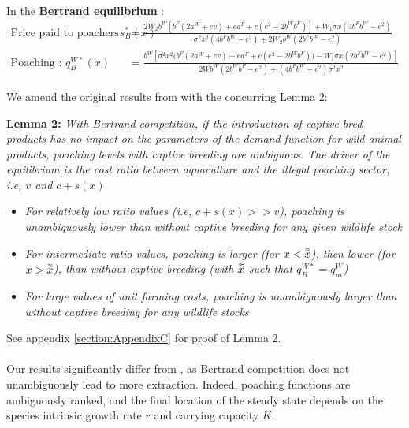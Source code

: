 In the \textbf{Bertrand equilibrium }:
\begin{align}
    \text{Price paid to poachers  }
 s_B^*(x) &=\frac{2 W_2 b^W[b^F(2a^W + ev) + e a^F + c(e^2 - 2b^Wb^F)] + W_1 \sigma x (4b^Fb^W - e^2)}{\sigma^2 x^2 (4b^F b^W - e^2) + 2 W_2 b^W(2b^F b^W - e^2)}\\
    \text{Poaching : }q^{W*}_B(x) &= \frac{b^W[\sigma^2 x^2 \big(b^F (2a^W + ev) + ea^F + c(e^2 - 2b^Wb^F)\big) - W_1 \sigma x (2b^F b^W - e^2)]}{2Wb^W (2b^Wb^F - e^2) + (4b^Fb^W - e^2) \sigma^2 x^2}
    \label{eq:poaching_bertrand}
\end{align}

We amend the original results from \cite{damania_economics_2007} with the concurring Lemma 2:
\begin{displayquote}
    \textbf{Lemma 2:} \textit{With Bertrand competition, if the introduction of captive-bred products has no impact on the parameters of the demand function for wild animal products, poaching levels  with captive breeding are ambiguous. The driver of the equilibrium is the cost ratio between aquaculture and the illegal poaching sector, i.e, $v$ and $c +s(x)$}

    \begin{itemize}
        \item \textit{For relatively low ratio values (i.e, $c + s(x) >> v$), poaching is unambiguously lower than without captive breeding for any given wildlife stock}
        \item \textit{For intermediate ratio values, poaching is larger (for $x<\accentset{\approx}{x}$), then lower (for $x>\accentset{\approx}{x}$), than without captive breeding (with $\accentset{\approx}{x}$ such that $q^{W*}_B=q^W_m$)}
        \item \textit{For large values of unit farming costs, poaching is unambiguously larger than without captive breeding for any wildlife stocks}
    \end{itemize}
\end{displayquote}
See appendix \ref{section:AppendixC} for proof of Lemma 2.
\\\\
Our results significantly differ from \cite{damania_economics_2007}, as Bertrand competition does not unambiguously lead to more extraction. Indeed, poaching functions are ambiguously ranked, and the final location of the steady state depends on the species intrinsic growth rate $r$ and carrying capacity $K$.

